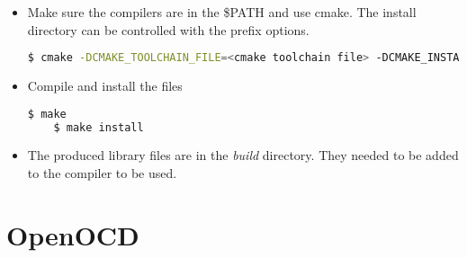 \documentclass{article}
\begin{document}
\begin{itemize}
    \item Make sure the compilers are in the \$PATH and use cmake. The install directory can be controlled with the prefix options.
    
    \begin{lstlisting}[language=bash]
    $ cmake -DCMAKE_TOOLCHAIN_FILE=<cmake toolchain file> -DCMAKE_INSTALL_PREFIX=$(pwd) -DLIBFTDI_LIBRARY_DIRS=$(pwd) ..
    \end{lstlisting}
    
    \item Compile and install the files
    
    \begin{lstlisting}[language=bash]
    $ make
    $ make install
    \end{lstlisting}
    
    \item The produced library files are in the \textit{build} directory. They needed to be added to the compiler to be used. 
    
    \end{itemize}
    
    \section{OpenOCD}
    
\end{document}
